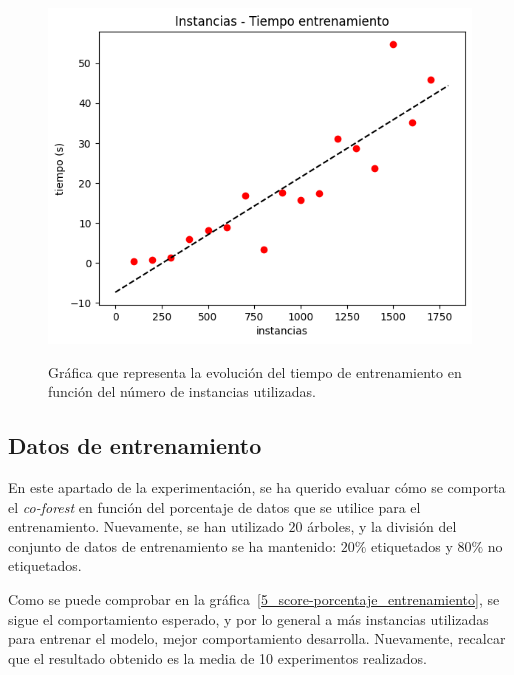 \begin{figure}[h]
	\caption{Gráfica que representa la evolución del tiempo de entrenamiento en función del número de instancias utilizadas.}
	\centering
	\includegraphics[width=\textwidth]{../img/memoria/5_coforest_tiempo-instancias}
	\label{5_coforest_tiempo-instancias}
\end{figure}


\subsection{Datos de entrenamiento}

En este apartado de la experimentación, se ha querido evaluar cómo se comporta el \textit{co-forest} en función del porcentaje de datos que se utilice para el entrenamiento. Nuevamente, se han utilizado  $20$ árboles, y la división del conjunto de datos de entrenamiento se ha mantenido: $20\%$ etiquetados y $80\%$ no etiquetados.

Como se puede comprobar en la gráfica~\ref{5_score-porcentaje_entrenamiento}, se sigue el comportamiento esperado, y por lo general a más instancias utilizadas para entrenar el modelo, mejor comportamiento desarrolla. Nuevamente, recalcar que el resultado obtenido es la media de 10 experimentos realizados.

